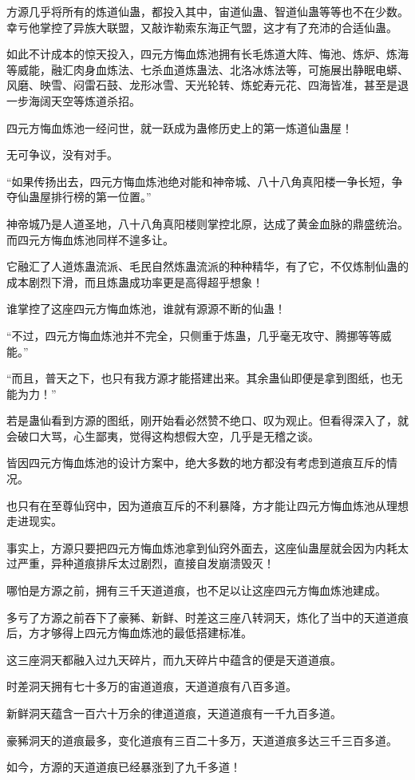 \begin{this_body}
方源几乎将所有的炼道仙蛊，都投入其中，宙道仙蛊、智道仙蛊等等也不在少数。幸亏他掌控了异族大联盟，又敲诈勒索东海正气盟，这才有了充沛的合适仙蛊。

如此不计成本的惊天投入，四元方悔血炼池拥有长毛炼道大阵、悔池、炼炉、炼海等威能，融汇肉身血炼法、七杀血道炼蛊法、北洛冰炼法等，可施展出静眠电蟒、风磨、映雪、闷雷石鼓、龙形冰雪、天光轮转、炼蛇寿元花、四海皆准，甚至是退一步海阔天空等炼道杀招。

四元方悔血炼池一经问世，就一跃成为蛊修历史上的第一炼道仙蛊屋！

无可争议，没有对手。

“如果传扬出去，四元方悔血炼池绝对能和神帝城、八十八角真阳楼一争长短，争夺仙蛊屋排行榜的第一位置。”

神帝城乃是人道圣地，八十八角真阳楼则掌控北原，达成了黄金血脉的鼎盛统治。而四元方悔血炼池同样不遑多让。

它融汇了人道炼蛊流派、毛民自然炼蛊流派的种种精华，有了它，不仅炼制仙蛊的成本剧烈下滑，而且炼蛊成功率更是高得超乎想象！

谁掌控了这座四元方悔血炼池，谁就有源源不断的仙蛊！

“不过，四元方悔血炼池并不完全，只侧重于炼蛊，几乎毫无攻守、腾挪等等威能。”

“而且，普天之下，也只有我方源才能搭建出来。其余蛊仙即便是拿到图纸，也无能为力！”

若是蛊仙看到方源的图纸，刚开始看必然赞不绝口、叹为观止。但看得深入了，就会破口大骂，心生鄙夷，觉得这构想假大空，几乎是无稽之谈。

皆因四元方悔血炼池的设计方案中，绝大多数的地方都没有考虑到道痕互斥的情况。

也只有在至尊仙窍中，因为道痕互斥的不利暴降，方才能让四元方悔血炼池从理想走进现实。

事实上，方源只要把四元方悔血炼池拿到仙窍外面去，这座仙蛊屋就会因为内耗太过严重，异种道痕排斥太过剧烈，直接自发崩溃毁灭！

哪怕是方源之前，拥有三千天道道痕，也不足以让这座四元方悔血炼池建成。

多亏了方源之前吞下了豪豨、新鲜、时差这三座八转洞天，炼化了当中的天道道痕后，方才够得上四元方悔血炼池的最低搭建标准。

这三座洞天都融入过九天碎片，而九天碎片中蕴含的便是天道道痕。

时差洞天拥有七十多万的宙道道痕，天道道痕有八百多道。

新鲜洞天蕴含一百六十万余的律道道痕，天道道痕有一千九百多道。

豪豨洞天的道痕最多，变化道痕有三百二十多万，天道道痕多达三千三百多道。

如今，方源的天道道痕已经暴涨到了九千多道！

\end{this_body}

